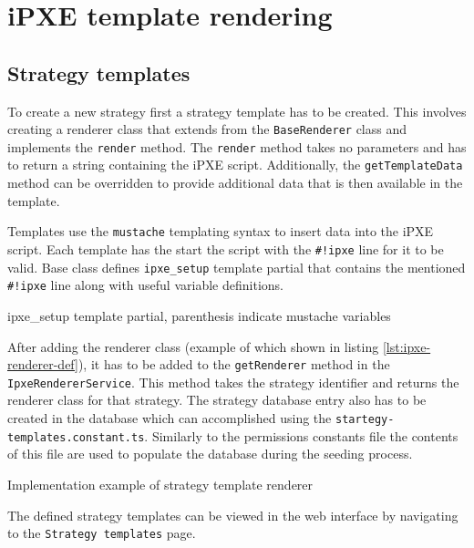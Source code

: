 \documentclass[../main.tex]{subfiles}
\begin{document}
\section{iPXE template rendering}

\subsection{Strategy templates}

To create a new strategy first a strategy template has to be created. This involves creating a renderer class that extends from the \texttt{BaseRenderer} class and implements the \texttt{render} method.
The \texttt{render} method takes no parameters and has to return a string containing the iPXE script. Additionally, the \texttt{getTemplateData} method can be overridden to provide additional
data that is then available in the template.

Templates use the \texttt{mustache} templating syntax to insert data into the iPXE script.
Each template has the start the script with the \texttt{\#!ipxe} line for it to be valid.
Base class defines \texttt{ipxe\_setup} template partial that contains the mentioned \texttt{\#!ipxe} line along with useful variable definitions.

\begin{listing}[H]
  \caption{ipxe\_setup template partial, parenthesis indicate mustache variables}
\end{listing}

After adding the renderer class (example of which shown in listing \ref{lst:ipxe-renderer-def}), it has to be added to the \texttt{getRenderer} method in the \texttt{IpxeRendererService}.
This method takes the strategy identifier and returns the renderer class for that strategy. The strategy database entry also has to be created in the database which can accomplished
using the \texttt{startegy-templates.constant.ts}. Similarly to the permissions constants file the contents of this file are used to populate the database during the seeding process.

\begin{listing}[H]
  \caption{Implementation example of strategy template renderer}
  \label{lst:ipxe-renderer-def}
\end{listing}

The defined strategy templates can be viewed in the web interface by navigating to the \texttt{Strategy templates} page.
\end{document}
